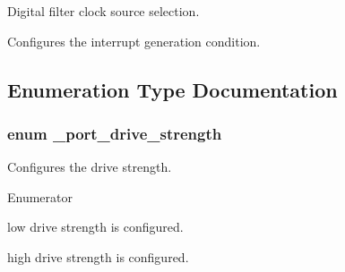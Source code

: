 Digital filter clock source selection. 

Configures the interrupt generation condition. 

\subsection{Enumeration Type Documentation}
\subsubsection[{\texorpdfstring{\+\_\+port\+\_\+drive\+\_\+strength}{_port_drive_strength}}]{\setlength{\rightskip}{0pt plus 5cm}enum {\bf \+\_\+port\+\_\+drive\+\_\+strength}}\hypertarget{group__port__hal_ga17fdac515979a1b6cefc0135add46f42}{}\label{group__port__hal_ga17fdac515979a1b6cefc0135add46f42}


Configures the drive strength. 

\begin{Desc}
\item[Enumerator]\par
\begin{description}
\item[{\em 
k\+Port\+Low\+Drive\+Strength\hypertarget{group__port__hal_gga17fdac515979a1b6cefc0135add46f42a9593bfe51d1f43d06a93c45b21ddacb6}{}\label{group__port__hal_gga17fdac515979a1b6cefc0135add46f42a9593bfe51d1f43d06a93c45b21ddacb6}
}]low drive strength is configured. \item[{\em 
k\+Port\+High\+Drive\+Strength\hypertarget{group__port__hal_gga17fdac515979a1b6cefc0135add46f42ad3fd42a5fe72ba226796cfffb7728fb9}{}\label{group__port__hal_gga17fdac515979a1b6cefc0135add46f42ad3fd42a5fe72ba226796cfffb7728fb9}
}]high drive strength is configured. \end{description}
\end{Desc}
